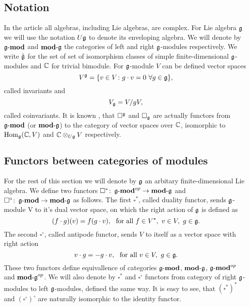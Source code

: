 % 

\subsection{Notation} 
In the article all algebras, including Lie algebras, are complex. 
For Lie algebra $\mathfrak{g}$ we will use the notation $U\mathfrak{g}$ to denote its enveloping algebra. We will
denote by $\operatorname{\mathbf{\mathfrak{g}-mod}}$ and $\operatorname{\mathbf{mod-\mathfrak{g}}}$ the categories of left and right $\mathfrak{g}$-modules respectively. 
We write $\hat{\mathfrak{g}}$ for the set of set of isomorphism classes of simple finite-dimensional
$\mathfrak{g}$-modules and $\mathbb{C}$ for trivial bimodule. 
For $\mathfrak{g}$-module $V$ can be defined vector spaces 
\begin{equation}
    V^{\mathfrak{g}} = \{v\in V\colon g\cdot v = 0 ~ \forall g\in \mathfrak{g} \}, 
\end{equation}
called invariants and
\begin{equation}
    V_{\mathfrak{g}} = V/gV,
\end{equation}
called coinvariants. It is known , that $\square^{\mathfrak{g}}$ and $\square_{\mathfrak{g}}$ are actually functors
from $\operatorname{\mathbf{\mathfrak{g}-mod}}$ (or $\operatorname{\mathbf{mod-\mathfrak{g}}}$) to the category of vector spaces over $\mathbb{C}$, isomorphic to
$\operatorname{Hom}_{\mathfrak{g}}(\mathbb{C}, V)$ and $\mathbb{C} \otimes_{U\mathfrak{g}} V$ respectively. 

\subsection{Functors between categories of modules}
For the rest of this section we will denote by $\mathfrak{g}$ an arbitary finite-dimensional Lie algebra.
We define two functors $\square^*\colon \operatorname{\mathbf{\mathfrak{g}-mod}}^{op} \to \operatorname{\mathbf{mod-\mathfrak{g}}}$ and $\square^\circ\colon
\operatorname{\mathbf{\mathfrak{g}-mod}} \to \operatorname{\mathbf{mod-\mathfrak{g}}}$ as follows. The first $\square^*$, called duality functor, sends 
$\mathfrak{g}$-module V to it's dual vector space, on which the right action of $\mathfrak{g}$ is defined as 
\[
    (f\cdot g) (v) = f(g\cdot v),~\text{ for all } f\in V^*,~v \in V,~g\in\mathfrak{g}.
\]
The second $\square^\circ$, called antipode functor, sends $V$ to itself as a vector space with right
action
\[\label{test}
    v\cdot g = - g\cdot v,~\text{ for all } v \in V,~g\in\mathfrak{g}.
\]
These two functors define equivallence of categories $\operatorname{\mathbf{\mathfrak{g}-mod}}$, $\operatorname{\mathbf{mod-\mathfrak{g}}}$, $\operatorname{\mathbf{\mathfrak{g}-mod}}^{op}$
and $\operatorname{\mathbf{mod-\mathfrak{g}}}^{op}$. We will also denote by $\square^*$ and $\square^\circ$ functors from
category of right $\mathfrak{g}$-modules to left $\mathfrak{g}$-modules, defined the same way. It is easy to
see, that $(\square^*)^*$ and $(\square^\circ)^\circ$ are naturally isomorphic to the identity functor.

